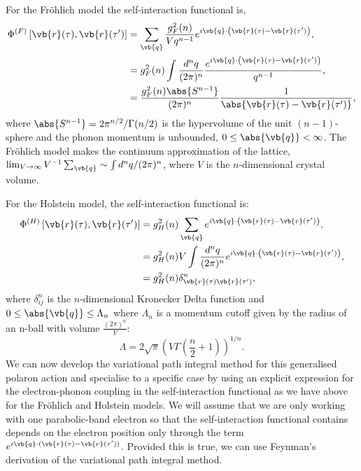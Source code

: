 For the Fr\"ohlich model the self-interaction functional is,
\begin{equation}
    \begin{aligned}
        \Phi^{(F)}\left[\vb{r}(\tau), \vb{r}(\tau')\right] &= \sum_{\vb{q}} \frac{g_{F}^2(n)}{V q^{n-1}} e^{i \vb{q} \cdot \left(\vb{r}(\tau) - \vb{r}(\tau') \right)} , \\
        &= g_{F}^2(n) \int \frac{d^n q}{(2\pi)^n} \frac{e^{i\vb{q}\cdot\left(\vb{r}(\tau) - \vb{r}(\tau')\right)}}{q^{n-1}} , \\
        &= \frac{g^2_F(n) \abs{S^{n-1}}}{(2\pi)^{n}} \frac{1}{\abs{\vb{r}(\tau) - \vb{r}(\tau')}} ,
    \end{aligned}
\end{equation}
where $\abs{S^{n-1}} = 2\pi^{n/2}/\Gamma(n/2)$ is the hypervolume of the unit $(n-1)$-sphere and the phonon momentum is unbounded, $0 \leq \abs{\vb{q}} < \infty$. The Fr\"ohlich model makes the continuum approximation of the lattice, $\lim_{V \to \infty} V^{-1}\sum_{\vb{q}} \sim \int d^nq / (2\pi)^n$, where $V$ is the $n$-dimensional crystal volume.
\newline

For the Holstein model, the self-interaction functional is:
\begin{equation}
    \begin{aligned}
        \Phi^{(H)}\left[\vb{r}(\tau), \vb{r}(\tau')\right] &= g_H^2(n) \sum_{\vb{q}} e^{i \vb{q} \cdot \left(\vb{r}(\tau) - \vb{r}(\tau') \right)} ,\\
        &= g_{H}^2(n) V \int \frac{d^n q}{(2\pi)^n} e^{i\vb{q}\cdot\left(\vb{r}(\tau) - \vb{r}(\tau')\right)}, \\
        &= g_H^2(n) \delta^n_{\vb{r}(\tau)\vb{r}(\tau')} ,
    \end{aligned}
\end{equation}
where $\delta^n_{ij}$ is the $n$-dimensional Kronecker Delta function and $0 \leq \abs{\vb{q}} \leq \Lambda_n$ where $\Lambda_n$ is a momentum cutoff given by the radius of an n-ball with volume $\frac{(2\pi)^n}{V}$:
\begin{equation}
    \Lambda = 2\sqrt{\pi} \left(V \Gamma\left(\frac{n}{2} + 1\right)\right)^{1/n}.
\end{equation}
We can now develop the variational path integral method for this generalised polaron action and specialise to a specific case by using an explicit expression for the electron-phonon coupling in the self-interaction functional as we have above for the Fr\"ohlich and Holstein models. We will assume that we are only working with one parabolic-band electron so that the self-interaction functional contains depends on the electron position only through the term $e^{i \vb{q} \cdot (\vb{r}(\tau) - \vb{r}(\tau'))}$. Provided this is true, we can use Feynman's derivation of the variational path integral method.